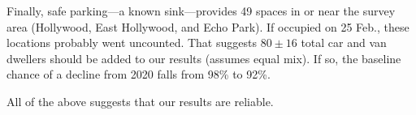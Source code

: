 \documentclass[11pt,twocolumn]{article}
\def\bfr{\bf\color{red}}
\begin{document}
Finally, safe parking---a known sink---provides 49 spaces in or near the survey area (Hollywood,
East Hollywood, and Echo Park). If occupied on 25 Feb., these locations probably went uncounted.
That suggests $80\pm16$ total car and van dwellers should be added to our results (assumes 
equal mix). If so, the baseline chance of a decline from 2020 falls from 98\% to 92\%.

All of the above suggests that our results are reliable.

%
%
%



%
\end{document}

